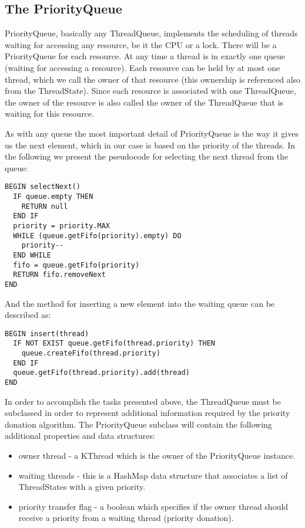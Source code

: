\documentclass[a4paper,10pt]{article}
\begin{document}
\subsection{The PriorityQueue}

PriorityQueue, basically any ThreadQueue, implements the scheduling of threads waiting for accessing any resource, be it the CPU or a lock. There will be a PriorityQueue for each resource. At any time a thread is in exactly one queue (waiting for accessing a resource). Each resource can be held by at most one thread, which we call the owner of that resource (this ownership is referenced also from the ThreadState). Since each resource is associated with one ThreadQueue, the owner of the resource is also called the owner of the ThreadQueue that is waiting for this resource.

As with any queue the most important detail of PriorityQueue is the way it gives us the next element, which in our case is based on the priority of the threads. In the following we present the pseudocode for selecting the next thread from the queue:
\begin{verbatim}
BEGIN selectNext()
  IF queue.empty THEN 
    RETURN null 
  END IF
  priority = priority.MAX
  WHILE (queue.getFifo(priority).empty) DO
    priority--
  END WHILE
  fifo = queue.getFifo(priority)
  RETURN fifo.removeNext
END
\end{verbatim}

And the method for inserting a new element into the waiting queue can be described as:
\begin{verbatim}
BEGIN insert(thread)
  IF NOT EXIST queue.getFifo(thread.priority) THEN 
    queue.createFifo(thread.priority) 
  END IF
  queue.getFifo(thread.priority).add(thread)
END
\end{verbatim}

In order to accomplish the tasks presented above, the ThreadQueue must be subclassed in order to represent additional information required by the priority donation algorithm. The PriorityQueue subclass will contain the following additional properties and data structures:
\begin{itemize}
\item owner thread - a KThread which is the owner of the PriorityQueue instance.
\item waiting threads - this is a HashMap data structure that associates a list of ThreadStates with a given priority.
\item priority transfer flag - a boolean which specifies if the owner thread should receive a priority from a waiting thread (priority donation).
\end{itemize}
\end{document}
